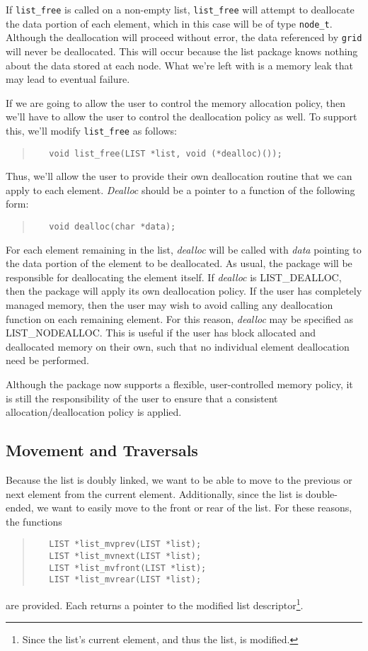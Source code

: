 \documentclass[fullpage,11pt]{article}
\begin{document}
If {\tt list\_free} is called on a non-empty list, {\tt list\_free} will
attempt to deallocate the data portion of each element, which in this case
will be of type {\tt node\_t}.  Although the deallocation will proceed without
error, the data referenced by {\tt grid} will never be deallocated.  This will
occur because the list package knows nothing about the data stored at each
node.  What we're left with is a memory leak that may lead to eventual
failure.

If we are going to allow the user to control the memory allocation policy,
then we'll have to allow the user to control the deallocation policy as well.
To support this, we'll modify {\tt list\_free} as follows:
\begin{quote}
\begin{verbatim}
   void list_free(LIST *list, void (*dealloc)());
\end{verbatim}
\end{quote}
Thus, we'll allow the user to provide their own deallocation routine that we
can apply to each element.  {\em Dealloc} should be a pointer to a function of
the following form:
\begin{quote}
\begin{verbatim}
   void dealloc(char *data);
\end{verbatim}
\end{quote}
For each element remaining in the list, {\em dealloc} will be called with {\em
data} pointing to the data portion of the element to be deallocated.  As
usual, the package will be responsible for deallocating the element itself.
If {\em dealloc} is LIST\_DEALLOC, then the package will apply its own
deallocation policy.  If the user has completely managed memory, then the user
may wish to avoid calling any deallocation function on each remaining element.
For this reason, {\em dealloc} may be specified as LIST\_NODEALLOC.  This is
useful if the user has block allocated and deallocated memory on their own,
such that no individual element deallocation need be performed.

Although the package now supports a flexible, user-controlled memory policy,
it is still the responsibility of the user to ensure that a consistent
allocation/deallocation policy is applied.

\subsection{Movement and Traversals}
Because the list is doubly linked, we want to be able to move to the previous
or next element from the current element.  Additionally, since the list is
double-ended, we want to easily move to the front or rear of the list.  For
these reasons, the functions
\begin{quote}
\begin{verbatim}
   LIST *list_mvprev(LIST *list);
   LIST *list_mvnext(LIST *list);
   LIST *list_mvfront(LIST *list);
   LIST *list_mvrear(LIST *list);
\end{verbatim}
\end{quote}
are provided.  Each returns a pointer to the modified list
descriptor\footnote{Since the list's current element, and thus the list, is
modified.}.
\end{document}
